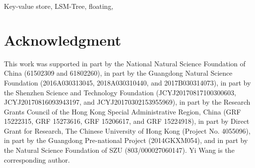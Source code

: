 \documentclass[conference]{IEEEtran}
\begin{document}
\begin{IEEEkeywords}
Key-value store, LSM-Tree, floating, 
\end{IEEEkeywords}







%
%
%
%
%


%
%
%







\section*{Acknowledgment}

This work was supported in part by the National
Natural Science Foundation of China (61502309
and 61802260),
in part by the Guangdong Natural Science Foundation
(2016A030313045, 2018A030310440, and 2017B030314073),
in part by the Shenzhen Science and Technology Foundation
(JCYJ20170817100300603,
JCYJ20170816093943197,
and JCYJ20170302153955969),
in part by the Research Grants Council of the Hong Kong Special Administrative Region, China
(GRF 15222315, GRF 15273616, GRF 15206617, and GRF 15224918),
in part by Direct Grant for Research, The Chinese University of Hong Kong (Project No. 4055096),
in part by the
Guangdong Pre-national Project (2014GKXM054),
and in part by the Natural Science Foundation of
SZU (803/000027060147). Yi Wang is the corresponding author.





%
%
\end{document}
